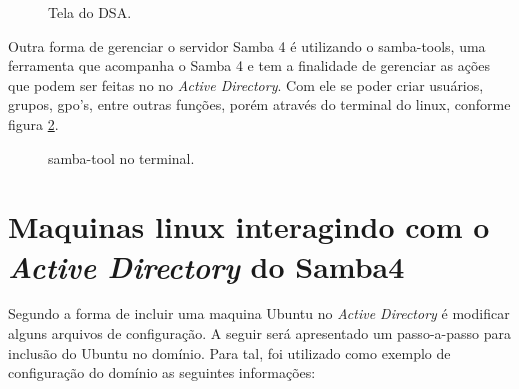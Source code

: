 
\begin{figure}[h!]
   	\centering
   	\caption{Tela do DSA.}
    \label{tela_dsa}
\end{figure}

Outra forma de gerenciar o servidor Samba 4 é utilizando o samba-tools, uma ferramenta que acompanha o Samba 4 e tem a finalidade de gerenciar as ações que podem ser feitas no no \textit{Active Directory}. Com ele se poder criar usuários, grupos, gpo's, entre outras funções, porém através do terminal do linux, conforme figura \ref{samba-tool}.

\begin{figure}[ht]
   	\centering
   	\caption{samba-tool no terminal.}
    \label{samba-tool}
\end{figure}

\section{Maquinas linux interagindo com o \textit{Active Directory} do  Samba4}

Segundo \cite{UBUNTU-WIKI} a forma de incluir uma maquina Ubuntu no \textit{Active Directory} é modificar alguns arquivos de configuração. A seguir será apresentado um passo-a-passo para inclusão do Ubuntu no domínio. Para tal, foi utilizado como exemplo de configuração do domínio as seguintes informações:

